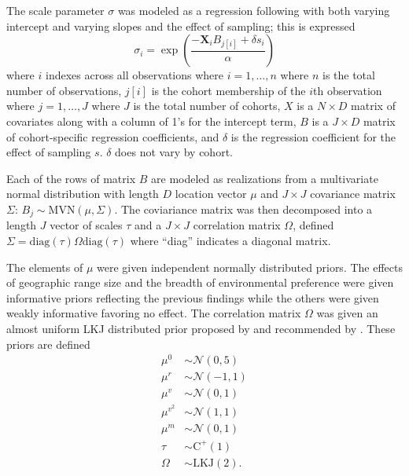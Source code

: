 \documentclass{article}
\begin{document}
The scale parameter \(\sigma\) was modeled as a regression following \citet{Kleinbaum2005} with both varying intercept and varying slopes and the effect of sampling; this is expressed
\begin{equation}
  \sigma_{i} = \exp\left(\frac{-\mathbf{X}_{i} B_{j[i]} + \delta s_{i}}{\alpha}\right)
  \label{eq:sigma}
\end{equation}
where \(i\) indexes across all observations where \(i = 1, \dots, n\) where \(n\) is the total number of observations, \(j[i]\) is the cohort membership of the \(i\)th observation where \(j = 1, \dots, J\) where \(J\) is the total number of cohorts, \(X\) is a \(N \times D\) matrix of covariates along with a column of 1's for the intercept term, \(B\) is a \(J \times D\) matrix of cohort-specific regression coefficients, and \(\delta\) is the regression coefficient for the effect of sampling \(s\). \(\delta\) does not vary by cohort.

Each of the rows of matrix \(B\) are modeled as realizations from a multivariate normal distribution with length \(D\) location vector \(\mu\) and \(J \times J\) covariance matrix \(\Sigma\): \(B_{j} \sim \mathrm{MVN}(\mu, \Sigma)\). The coviariance matrix was then decomposed into a length \(J\) vector of scales \(\tau\) and a \(J \times J\) correlation matrix \(\Omega\), defined \(\Sigma = \mathrm{diag}(\tau) \Omega \mathrm{diag}(\tau)\) where ``diag'' indicates a diagonal matrix.

The elements of \(\mu\) were given independent normally distributed priors. The effects of geographic range size  and the breadth of environmental preference were given informative priors reflecting the previous findings while the others were given weakly informative favoring no effect. The correlation matrix \(\Omega\) was given an almost uniform LKJ distributed prior proposed by \citet{Lewandowski2009} and recommended by \citet{stan-manual:2014}. These priors are defined
\begin{equation}
  \begin{aligned}
    \mu^{0} &\sim \mathcal{N}(0, 5) \\
    \mu^{r} &\sim \mathcal{N}(-1, 1) \\
    \mu^{v} &\sim \mathcal{N}(0, 1) \\
    \mu^{v^{2}} &\sim \mathcal{N}(1, 1) \\
    \mu^{m} &\sim \mathcal{N}(0, 1) \\
    \tau &\sim \mathrm{C^{+}}(1) \\
    \Omega &\sim \text{LKJ}(2).
  \end{aligned}
  \label{eq:sigma_prior}
\end{equation}
\end{document}
